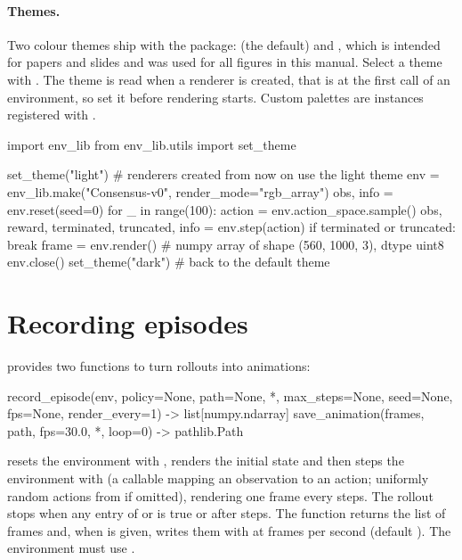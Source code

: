 \paragraph{Themes.} Two colour themes ship with the package: 
(the default) and , which is intended for papers and slides and
was used for all figures in this manual. Select a theme with
. The theme is read when a renderer is created,
that is at the first  call of an environment, so set it before
rendering starts. Custom palettes are  instances
registered with .

\begin{pycode}
import env_lib
from env_lib.utils import set_theme

set_theme("light")          # renderers created from now on use the light theme
env = env_lib.make("Consensus-v0", render_mode="rgb_array")
obs, info = env.reset(seed=0)
for _ in range(100):
    action = env.action_space.sample()
    obs, reward, terminated, truncated, info = env.step(action)
    if terminated or truncated:
        break
frame = env.render()        # numpy array of shape (560, 1000, 3), dtype uint8
env.close()
set_theme("dark")           # back to the default theme
\end{pycode}

\section{Recording episodes}\label{sec:envlib-recording}

 provides two functions to turn rollouts into animations:

\begin{pycode}
record_episode(env, policy=None, path=None, *, max_steps=None, seed=None,
               fps=None, render_every=1) -> list[numpy.ndarray]
save_animation(frames, path, fps=30.0, *, loop=0) -> pathlib.Path
\end{pycode}

 resets the environment with , renders the
initial state and then steps the environment with  (a callable
mapping an observation to an action; uniformly random actions from
 if omitted), rendering one frame every
 steps. The rollout stops when any entry of
 or  is true or after 
steps. The function returns the list of frames and, when  is given,
writes them with  at  frames per second (default
). The environment must use
.

